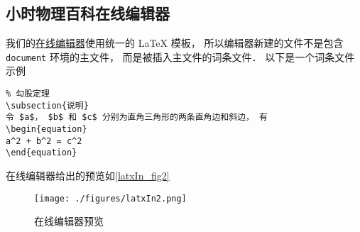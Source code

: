 \subsection{小时物理百科在线编辑器}

我们的\href{http://wuli.wiki}{在线编辑器}使用统一的 LaTeX 模板， 所以编辑器新建的文件不是包含 \lstinline|document| 环境的主文件， 而是被插入主文件的词条文件． 以下是一个词条文件示例

\begin{lstlisting}
% 勾股定理
\subsection{说明}
令 $a$， $b$ 和 $c$ 分别为直角三角形的两条直角边和斜边， 有
\begin{equation}
a^2 + b^2 = c^2
\end{equation}
\end{lstlisting}
在线编辑器给出的预览如\autoref{latxIn_fig2}
\begin{figure}[ht]
\centering
\texttt{[image: ./figures/latxIn2.png]}
\caption{在线编辑器预览} \label{latxIn_fig3}
\end{figure}
